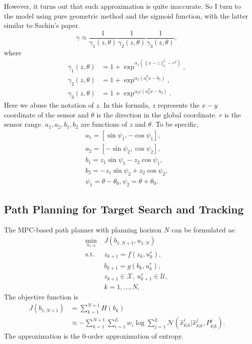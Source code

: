 \documentclass[letterpaper, 10 pt, conference]{ieeeconf}  %
\begin{document}
However, it turns out that such approximation is quite inaccurate. So I turn to the model using pure geometric method and the sigmoid function, with the latter similar to Sachin's paper.
\begin{equation}\label{eqn:gamma}
\gamma\approx \frac{1}{\gamma_1(z,\theta)}\frac{1}{\gamma_2(z,\theta)}\frac{1}{\gamma_3(z,\theta)},
\end{equation}
where \begin{align*}
\gamma_1(z,\theta)&=1+\exp^{\alpha_1(\|x-z\|^2_2-r^2)},\\
\gamma_2(z,\theta)&=1+\exp^{\alpha_2(a^T_1x-b_1)},\\
\gamma_3(z,\theta)&=1+\exp^{\alpha_3((a^T_2x-b_2)}.
\end{align*}
Here we abuse the notation of $z$. 
In this formula, $z$ represents the $x-y$ coordinate of the sensor and $\theta$ is the direction in the global coordinate. 
$r$ is the sensor range. $a_1,a_2,b_1,b_2$ are functions of $z$ and $\theta$. 
To be specific, 
\begin{equation*}
\begin{split}
a_1=[\sin\psi_1,-\cos\psi_1],\\
a_2=[-\sin\psi_2,\cos\psi_2],\\
b_1=z_1\sin\psi_1-z_2\cos\psi_1,\\
b_2=-z_1\sin\psi_2+z_2\cos\psi_2,\\
\psi_1=\theta-\theta_0, \psi_2=\theta+\theta_0.
\end{split}
\end{equation*}

\subsection{Path Planning for Target Search and Tracking}
The MPC-based path planner with planning horizon $N$ can be formulated as:
\begin{subequations}
	\begin{align}
	\min_{u_{1:N}}\; & J(b_{1:N+1},u_{1:N})\\
	\text{s.t. }\; & z_{k+1}=f(z_k,u^r_k),\label{subeqn:rbt_dyn}\\
	& b_{k+1}=g(b_k,u^r_k),\label{subeqn:est_upd}\\
	& z_{k+1}\in\mathcal{X}, \, u^r_{k+1}\in\mathcal{U},\\
	& k=1,\dots,N,
	\end{align}\label{eqn:MPC}
\end{subequations}
The objective function is
\begin{align}
J(b_{1:N+1})&=\sum\limits_{k=1}^{N+1} H(b_k)\\ %
& \approx -\sum\limits_{k=1}^{N+1} \sum\limits_{i=1}^{L}w_i\log \sum\limits_{j=1}^L\mathcal{N}(\hat{x}^i_{k|k}|\hat{x}^j_{k|k},P^j_{k|k})\label{eqn:approx_obj}.
\end{align}
The approximation is the $0$-order approximation of entropy.
\end{document}

